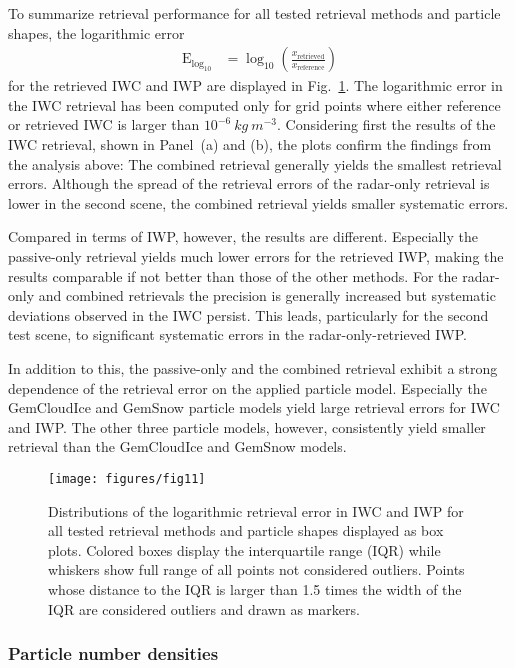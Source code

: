 \documentclass[journal abbreviation, manuscript]{copernicus}
\begin{document}
To summarize retrieval performance for all tested retrieval methods and particle
shapes, the logarithmic error
\begin{align}
  \text{E}_{\text{log}_{10}} &= \log_\text{10} \left (\frac{x_\text{retrieved}}{x_\text{reference}} \right )
\end{align}
for the retrieved IWC and IWP are displayed in Fig.~\ref{fig:boxes}. The
logarithmic error in the IWC retrieval has been computed only for grid points
where either reference or retrieved IWC is larger than
$10^{-6}\ \unit{kg\ m^{-3}}$. Considering first the results of the IWC
retrieval, shown in Panel~(a) and (b), the plots confirm the findings from the
analysis above: The combined retrieval generally yields the smallest retrieval
errors. Although the spread of the retrieval errors of the radar-only retrieval
is lower in the second scene, the combined retrieval yields smaller systematic
errors.

Compared in terms of IWP, however, the results are different. Especially the
passive-only retrieval yields much lower errors for the retrieved IWP, making
the results comparable if not better than those of the other methods. For the
radar-only and combined retrievals the precision is generally increased but
systematic deviations observed in the IWC persist. This leads, particularly for
the second test scene, to significant systematic errors in the
radar-only-retrieved IWP.

In addition to this, the passive-only and the combined retrieval exhibit a
strong dependence of the retrieval error on the applied particle model.
Especially the GemCloudIce and GemSnow particle models yield large retrieval
errors for IWC and IWP. The other three particle models, however, consistently
yield smaller retrieval than the GemCloudIce and GemSnow models.


\begin{figure}[!h]
\centering
\texttt{[image: figures/fig11]}
\caption{Distributions of the logarithmic retrieval error in IWC and IWP for all tested retrieval
  methods and particle shapes displayed as box plots. Colored boxes display the interquartile range (IQR)
  while whiskers show full range of all points not considered outliers. Points whose distance to
  the IQR is larger than 1.5 times the width of the IQR are considered outliers and drawn as markers.}
\label{fig:boxes}
\end{figure}

\subsubsection{Particle number densities}
\end{document}
